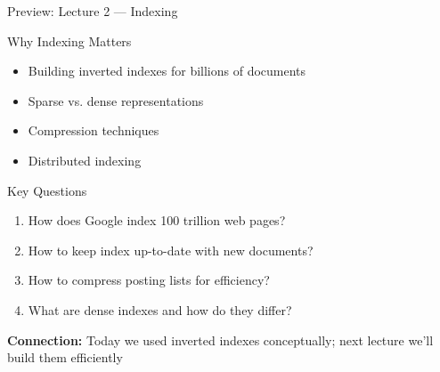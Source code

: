 \documentclass[aspectratio=169]{beamer}
\newif\ifanimated
\newcommand{\cpause}{\ifanimated\pause\fi}
\begin{document}
\begin{frame}[shrink=5]{Preview: Lecture 2 — Indexing}
\begin{block}{Why Indexing Matters}
\begin{itemize}
    \item Building inverted indexes for billions of documents
    \item Sparse vs. dense representations
    \item Compression techniques
    \item Distributed indexing
\end{itemize}
\cpause
\end{block}
\cpause
\vspace{1em}

\begin{exampleblock}{Key Questions}
\begin{enumerate}
    \item How does Google index 100 trillion web pages?
    \item How to keep index up-to-date with new documents?
    \item How to compress posting lists for efficiency?
    \item What are dense indexes and how do they differ?
\end{enumerate}
\cpause
\end{exampleblock}
\cpause
\vspace{1em}

\textbf{Connection:} Today we used inverted indexes conceptually; next lecture we'll build them efficiently
\end{frame}
\end{document}

